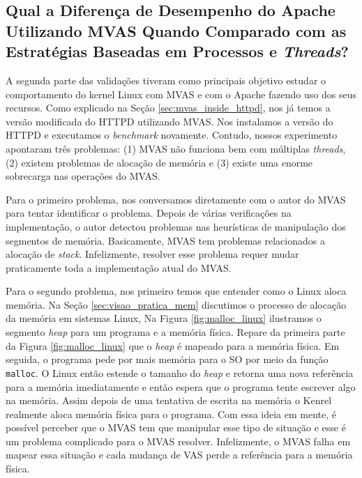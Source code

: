 \subsection{Qual a Diferença de Desempenho do Apache Utilizando MVAS Quando
Comparado com as Estratégias Baseadas em Processos e \emph{Threads}?}

A segunda parte das validações tiveram como principais objetivo estudar o
comportamento do kernel Linux com MVAS e com o Apache fazendo uso dos seus
recursos. Como explicado na Seção \ref{sec:mvas_inside_httpd}, nos já temos a
versão modificada do HTTPD utilizando MVAS. Nos instalamos a versão do HTTPD e
executamos o \emph{benchmark} novamente. Contudo, nossos experimento apontaram
três problemas: (1) MVAS não funciona bem com múltiplas \emph{threads}, (2)
existem problemas de alocação de memória e (3) existe uma enorme sobrecarga nas
operações do MVAS.

Para o primeiro problema, nos conversamos diretamente com o autor do MVAS para
tentar identificar o problema. Depois de várias verificações na implementação,
o autor detectou problemas nas heurísticas de manipulação dos segmentos de
memória.  Basicamente, MVAS tem problemas relacionados a alocação de
\emph{stack}.  Infelizmente, resolver esse problema requer mudar praticamente
toda a implementação atual do MVAS.


Para o segundo problema, nos primeiro temos que entender como o Linux aloca
memória. Na Seção \ref{sec:visao_pratica_mem} discutimos o processo de alocação
da memória em sistemas Linux, Na Figura \ref{fig:malloc_linux} ilustramos o
segmento \emph{heap} para um programa e a memória física. Repare da primeira
parte da Figura \ref{fig:malloc_linux} que o \emph{heap} é mapeado para a
memória física. Em seguida, o programa pede por mais memória para o SO por meio
da função \texttt{malloc}. O Linux então estende o tamanho do \emph{heap} e
retorna uma nova referência para a memória imediatamente e então espera que o
programa tente escrever algo na memória. Assim depois de uma tentativa de
escrita na memória o Kenrel realmente aloca memória física para o programa. Com
essa ideia em mente, é possível perceber que o MVAS tem que manipular esse tipo
de situação e esse é um problema complicado para o MVAS resolver. Infelizmente,
o MVAS falha em mapear essa situação e cada mudança de VAS perde a referência
para a memória física.



